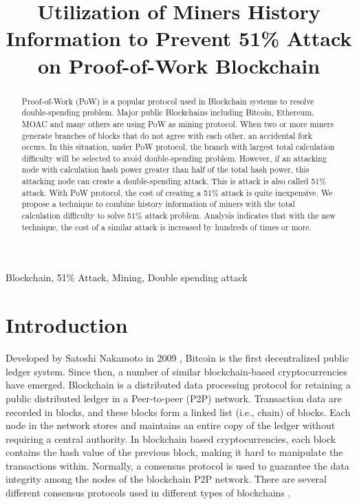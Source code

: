 \documentclass[conference]{IEEEtran}
\begin{document}
\title{Utilization of Miners History Information to Prevent 51\% Attack on Proof-of-Work Blockchain\\
}

\author{
}

\maketitle

\begin{abstract}
Proof-of-Work (PoW) is a popular protocol used in Blockchain systems to resolve double-spending problem. Major public Blockchains including Bitcoin, Ethereum, MOAC and many others are using PoW as mining protocol. When two or more miners generate branches of blocks that do not agree with each other, an accidental fork occurs. In this situation, under PoW protocol, the branch with largest total calculation difficulty will be selected to avoid double-spending problem. However, if an attacking node with calculation hash power greater than half of the total hash power, this attacking node can create a double-spending attack. This is attack is also called 51\% attack. With PoW protocol, the cost of creating a 51\% attack is quite inexpensive. We propose a technique to combine history information of miners with the total calculation difficulty to solve 51\% attack problem. Analysis indicates that with the new technique, the cost of a similar attack is increased by hundreds of times or more.
\end{abstract}

\begin{IEEEkeywords}
Blockchain, 51\% Attack, Mining, Double spending attack
\end{IEEEkeywords}

\section{Introduction}
Developed by Satoshi Nakamoto in 2009 \cite{b1}, Bitcoin is the first decentralized public ledger system. Since then, a number of similar blockchain-based cryptocurrencies have emerged. Blockchain is a distributed data processing protocol for retaining a public distributed ledger in a Peer-to-peer (P2P) network. Transaction data are recorded in blocks, and these blocks form a linked list (i.e., chain) of blocks. Each node in the network stores and maintains an entire copy of the ledger without requiring a central authority. In blockchain based cryptocurrencies, each block contains the hash value of the previous block, making it hard to manipulate the transactions within. Normally, a consensus protocol is used to guarantee the data integrity among the nodes of the blockchain P2P network. There are several different consensus protocols used in different types of blockchains \cite{b2}.
\end{document}
